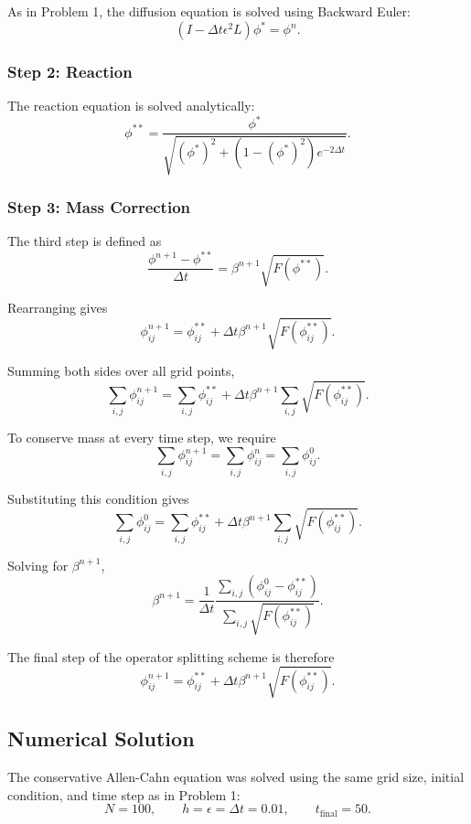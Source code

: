 \documentclass[11pt]{article}
\begin{document}
As in Problem 1, the diffusion equation is solved 
using Backward Euler:
\[
    (I-\Delta t\epsilon^2L)\phi^*=\phi^n.
\]

\subsubsection*{Step 2: Reaction}
The reaction equation is solved analytically:
\[
    \phi^{**}
    =
    \frac{\phi^*}
    {\sqrt{(\phi^*)^2+
    (1-(\phi^*)^2)e^{-2\Delta t}}}.
\]

\subsubsection*{Step 3: Mass Correction}

The third step is defined as
\[
    \frac{\phi^{n+1}-\phi^{**}}{\Delta t}
    =
    \beta^{n+1}\sqrt{F(\phi^{**})}.
\]

Rearranging gives
\[
    \phi_{ij}^{n+1}
    =
    \phi_{ij}^{**}
    +\Delta t\beta^{n+1}
    \sqrt{F(\phi_{ij}^{**})}.
\]

Summing both sides over all grid points,
\[
    \sum_{i,j}\phi_{ij}^{n+1}
    =
    \sum_{i,j}\phi_{ij}^{**}
    +\Delta t\beta^{n+1}
    \sum_{i,j}\sqrt{F(\phi_{ij}^{**})}.
\]

To conserve mass at every time step, we require
\[
    \sum_{i,j}\phi_{ij}^{n+1}
    =
    \sum_{i,j}\phi_{ij}^{n}
    =
    \sum_{i,j}\phi_{ij}^{0}.
\]

Substituting this condition gives
\[
    \sum_{i,j}\phi_{ij}^{0}
    =
    \sum_{i,j}\phi_{ij}^{**}
    +\Delta t\beta^{n+1}
    \sum_{i,j}\sqrt{F(\phi_{ij}^{**})}.
\]

Solving for $\beta^{n+1}$,
\[
    \boxed{
    \beta^{n+1}
    =
    \frac{1}{\Delta t}
    \frac{
        \displaystyle\sum_{i,j}
        (\phi_{ij}^{0}-\phi_{ij}^{**})
    }{
        \displaystyle\sum_{i,j}
        \sqrt{F(\phi_{ij}^{**})}
    }.
    }
\]

The final step of the operator splitting scheme is therefore
\[
    \boxed{
    \phi_{ij}^{n+1}
    =
    \phi_{ij}^{**}
    +\Delta t\beta^{n+1}
    \sqrt{F(\phi_{ij}^{**})}.
    }
\]

\subsection*{Numerical Solution}
The conservative Allen-Cahn equation was solved using the same grid size, initial condition, and time step as in Problem 1:
\[
    N=100,\qquad
    h=\epsilon=\Delta t=0.01,
    \qquad t_{\mathrm{final}}=50.
\]
\end{document}

